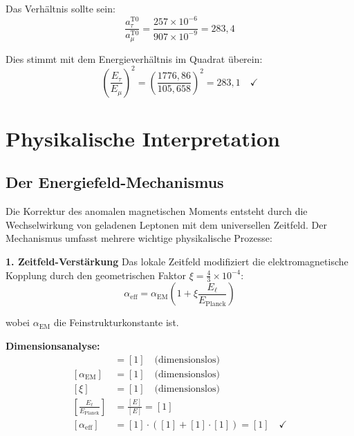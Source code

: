\documentclass[12pt,a4paper]{report}
\begin{document}
	Das Verhältnis sollte sein:
	\begin{equation}
		\frac{a_\tau^{\text{T0}}}{a_\mu^{\text{T0}}} = \frac{257 \times 10^{-6}}{907 \times 10^{-9}} = 283,4
	\end{equation}
	
	Dies stimmt mit dem Energieverhältnis im Quadrat überein:
	\begin{equation}
		\left(\frac{E_\tau}{E_\mu}\right)^2 = \left(\frac{1776,86}{105,658}\right)^2 = 283,1 \quad \checkmark
	\end{equation}
	
	\section{Physikalische Interpretation}
	\label{sec:physical_interpretation}
	
	\subsection{Der Energiefeld-Mechanismus}
	\label{subsec:energy_field_mechanism}
	
	Die Korrektur des anomalen magnetischen Moments entsteht durch die Wechselwirkung von geladenen Leptonen mit dem universellen Zeitfeld. Der Mechanismus umfasst mehrere wichtige physikalische Prozesse:
	
	\textbf{1. Zeitfeld-Verstärkung}
	Das lokale Zeitfeld modifiziert die elektromagnetische Kopplung durch den geometrischen Faktor $\xi = \frac{4}{3} \times 10^{-4}$:
	\begin{equation}
		\alpha_{\text{eff}} = \alpha_{\text{EM}} \left(1 + \xi \frac{E_\ell}{E_{\text{Planck}}}\right)
	\end{equation}
	
	wobei $\alpha_{\text{EM}}$ die Feinstrukturkonstante ist.
	
	\textbf{Dimensionsanalyse:}
	\begin{align}
		[\alpha_{\text{eff}}] &= [1] \quad \text{(dimensionslos)} \\
		[\alpha_{\text{EM}}] &= [1] \quad \text{(dimensionslos)} \\
		[\xi] &= [1] \quad \text{(dimensionslos)} \\
		\left[\frac{E_\ell}{E_{\text{Planck}}}\right] &= \frac{[E]}{[E]} = [1] \\
		[\alpha_{\text{eff}}] &= [1] \cdot ([1] + [1] \cdot [1]) = [1] \quad \checkmark
	\end{align}
	
\end{document}
